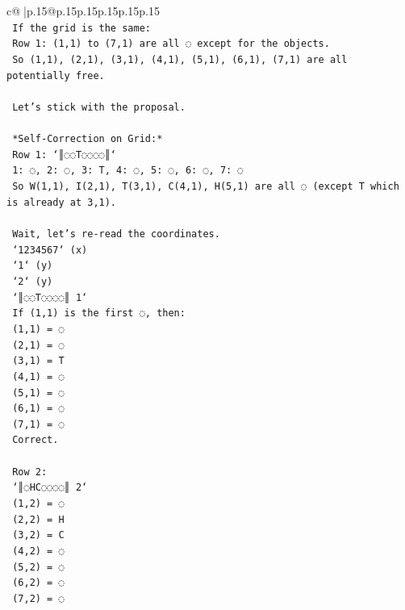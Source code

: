 \documentclass{article}
\begin{document}
{\begin{supertabular}{c@{$\;$}|p{.15\linewidth}@{}p{.15\linewidth}p{.15\linewidth}p{.15\linewidth}p{.15\linewidth}p{.15\linewidth}}
{{{\\ 
\texttt{    If the grid is the same:} \\
\texttt{    Row 1: (1,1) to (7,1) are all ◌ except for the objects.} \\
\texttt{    So (1,1), (2,1), (3,1), (4,1), (5,1), (6,1), (7,1) are all potentially free.} \\
\\ 
\texttt{    Let's stick with the proposal.} \\
\\ 
\texttt{    *Self{-}Correction on Grid:*} \\
\texttt{    Row 1: `║◌◌T◌◌◌◌║`} \\
\texttt{    1: ◌, 2: ◌, 3: T, 4: ◌, 5: ◌, 6: ◌, 7: ◌} \\
\texttt{    So W(1,1), I(2,1), T(3,1), C(4,1), H(5,1) are all ◌ (except T which is already at 3,1).} \\
\\ 
\texttt{    Wait, let's re{-}read the coordinates.} \\
\texttt{    `1234567` (x)} \\
\texttt{    `1` (y)} \\
\texttt{    `2` (y)} \\
\texttt{    `║◌◌T◌◌◌◌║ 1`} \\
\texttt{    If (1,1) is the first ◌, then:} \\
\texttt{    (1,1) = ◌} \\
\texttt{    (2,1) = ◌} \\
\texttt{    (3,1) = T} \\
\texttt{    (4,1) = ◌} \\
\texttt{    (5,1) = ◌} \\
\texttt{    (6,1) = ◌} \\
\texttt{    (7,1) = ◌} \\
\texttt{    Correct.} \\
\\ 
\texttt{    Row 2:} \\
\texttt{    `║◌HC◌◌◌◌║ 2`} \\
\texttt{    (1,2) = ◌} \\
\texttt{    (2,2) = H} \\
\texttt{    (3,2) = C} \\
\texttt{    (4,2) = ◌} \\
\texttt{    (5,2) = ◌} \\
\texttt{    (6,2) = ◌} \\
\texttt{    (7,2) = ◌} \\
}}}
\end{supertabular}}
\end{document}

